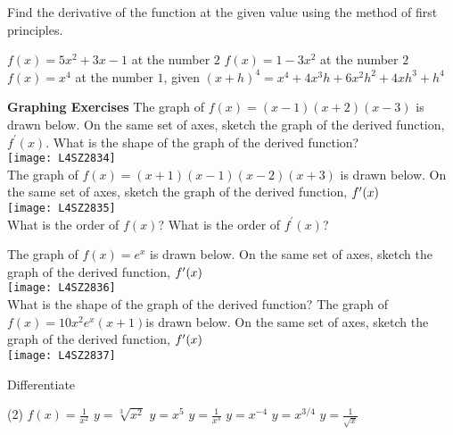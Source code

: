 \begin{Exercise}[title={Differentiation from First Principles},label=exFirstPrinciples]
	\Question Find the derivative of the function at the given value using the method of first principles.
	\begin{tasks}
		\task $f (x) =5 x^{2} +3 x -1$ at the number $2$%
		\task $f (x) =1 -3 x^{2}$ at the number $2$%
		\task $f (x) =x^{4}$ at the number $1$, given $(x +h)^{4} =x^{4} +4 x^{3} h +6 x^{2} h^{2} +4 x h^{3} +h^{4}$%
	\end{tasks}

{\hspace{-0.6cm}\textbf{Graphing Exercises}}	
\Question The graph of $f (x) =(x -1) (x +2) (x -3)$ is drawn below. On the same set of axes, sketch the graph of the derived function, $f^{ \prime } (x)$. What is the shape of the graph of the derived function?\\
\texttt{[image: L4SZ2834]}\\
\Question The graph of $f (x) =(x +1) (x -1) (x -2) (x +3)$ is drawn below. On the same set of axes, sketch the graph of the derived function, $f^{ \prime } (x)\vspace{+0.500000cm}$ \\
\texttt{[image: L4SZ2835]}\\
What is the order of $f (x)$? What is the order of $f^{ \prime } (x)$?%

\Question The graph of $f (x) =e^{x}$ is drawn below. On the same set of axes, sketch the graph of the derived function, $f^{ \prime } (x)\vspace{+0.500000cm}$ \\
\texttt{[image: L4SZ2836]}\\
What is the shape of the graph of the derived function?
\clearpage	
\Question The graph of $f (x) =10 x^{2} e^{x} (x +1)$is drawn below. On the same set of axes, sketch the graph of the derived function, $f^{ \prime } (x)\vspace{+0.500000cm}$ \\
\texttt{[image: L4SZ2837]}%

	\Question Differentiate
\begin{tasks}(2)
	\task  $f (x) =\frac{1}{x^{2}}$ %
	\task $y =\sqrt[{3}]{x^{2}}$ %
	\task $y =x^{5}$ %
	\task $y =\frac{1}{x^{3}}$ %
	\task $y =x^{ -4}$ %
	\task $y =x^{3/4}$ %
	\task $y =\frac{1}{\sqrt{x}}$ %
\end{tasks}
\end{Exercise}
